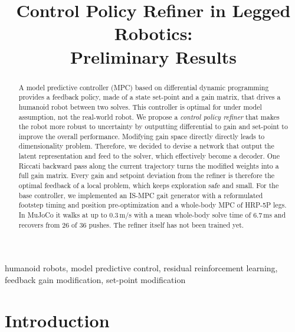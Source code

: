 \documentclass[conference]{IEEEtran}
\begin{document}
\title{Control Policy Refiner in Legged Robotics:\\ Preliminary Results}

\author{
}

\maketitle

\begin{abstract}
A model predictive controller (MPC) based on differential dynamic programming provides a feedback policy, made of a state set-point and a gain matrix, that drives a humanoid robot between two solves.
This controller is optimal for under model assumption, not the real-world robot.
We propose a \emph{control policy refiner} that makes the robot more robust to uncertainty by outputting differential to gain and set-point to improve the overall performance.
Modifying gain space directly directly leads to dimensionality problem. Therefore, we decided to devise a network that output the latent representation and feed to the solver, which effectively become a decoder. One Riccati backward pass along the current trajectory turns the modified weights into a full gain matrix.
Every gain and setpoint deviation from the refiner is therefore the optimal feedback of a local problem, which keeps exploration safe and small.
For the base controller, we implemented an IS-MPC gait generator with a reformulated footstep timing and position pre-optimization and a whole-body MPC of HRP-5P legs.
In MuJoCo it walks at up to 0.3\,m/s with a mean whole-body solve time of 6.7\,ms and recovers from 26 of 36 pushes.
The refiner itself has not been trained yet.
\end{abstract}

\begin{IEEEkeywords}
humanoid robots, model predictive control, residual reinforcement learning, feedback gain modification, set-point modification
\end{IEEEkeywords}

\section{Introduction}
\end{document}
